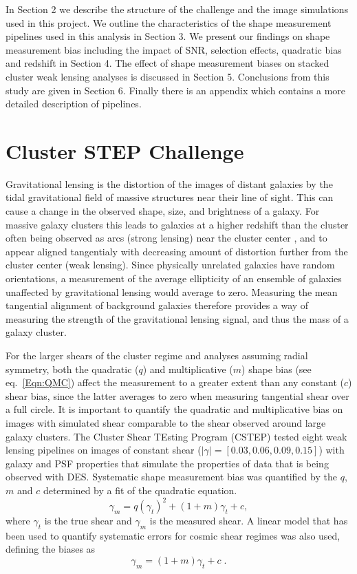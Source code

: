 \documentclass[useAMS,usenatbib]{mn2e}
\begin{document}
In Section 2 we describe the structure of the challenge and the image simulations used in this
project. We outline the characteristics of the shape
measurement pipelines used in this analysis in Section 3. We present
our findings on shape measurement bias including the impact of SNR, selection
effects, quadratic bias and redshift in Section 4. The
effect of shape measurement biases on stacked cluster weak lensing
analyses is discussed in Section 5.  Conclusions from this study are 
given in Section 6.  Finally there is an appendix which contains a more detailed
description of pipelines. 



\section{Cluster STEP Challenge}
Gravitational lensing is the distortion of the images of
distant galaxies by the tidal gravitational field of massive structures near
their line of sight. This can
cause a change in the observed shape, size, and brightness of a
galaxy. For massive galaxy clusters this leads to galaxies at a
higher redshift than the cluster often being
observed as arcs (strong lensing) near the cluster center , and to
appear aligned tangentialy with decreasing amount of distortion further from
the cluster center (weak lensing). Since physically unrelated galaxies 
have random orientations, a measurement of the average ellipticity of
an ensemble of galaxies unaffected by gravitational lensing would average
to zero. Measuring the mean tangential alignment of background galaxies therefore provides a way of
measuring the strength of the gravitational lensing signal, and thus the
mass of a galaxy cluster. 

For the larger shears of the cluster regime and analyses assuming radial symmetry, both the quadratic ($q$) and
multiplicative ($m$) shape bias (see eq.~\ref{Eqn:QMC})
affect the measurement to a greater extent than any
constant ($c$) shear bias, since the latter averages to zero when measuring
tangential shear over a full circle. It is
important to quantify the quadratic and multiplicative bias on images
with simulated shear comparable to the shear observed around large
galaxy clusters. The Cluster Shear TEsting Program (CSTEP) tested eight weak lensing pipelines on images of constant shear
($|\gamma| = [0.03, 0.06, 0.09, 0.15]$) with galaxy and PSF properties that simulate the properties
of data that is being observed with DES. Systematic shape measurement bias was quantified by the $q$, $m$ and $c$
determined by a fit of the quadratic equation.
\begin{equation}\label{Eqn:QMC}
\gamma_m = q (\gamma_t)^2 + (1+m) \gamma_t + c,
\end {equation}
where $\gamma_t$ is the true shear and $\gamma_m$ is the measured
shear. A linear model that has been used to quantify systematic errors
for cosmic shear regimes was also used, defining the biases as \citep{STEP1}
\begin{equation}\label{Eqn:MC}
\gamma_m = (1+m) \gamma_t + c \; .
\end {equation}
\end{document}
